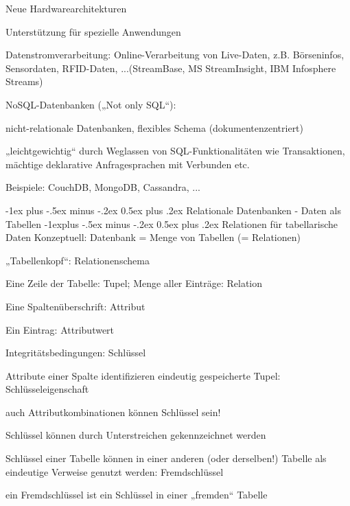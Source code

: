 \documentclass[a4paper]{article}
\makeatletter
\renewcommand{\section}{\@startsection{section}{1}{0mm}%
                                {-1ex plus -.5ex minus -.2ex}%
                                {0.5ex plus .2ex}%
                                {\normalfont\large\bfseries}}
\renewcommand{\subsection}{\@startsection{subsection}{2}{0mm}%
                                {-1explus -.5ex minus -.2ex}%
                                {0.5ex plus .2ex}%
                                {\normalfont\normalsize\bfseries}}
\makeatother
\begin{document}
\begin{multicols}{3}
\begin{itemize*}
    \item Neue Hardwarearchitekturen
    \item Unterstützung für spezielle Anwendungen
    \item Datenstromverarbeitung: Online-Verarbeitung von Live-Daten, z.B. Börseninfos, Sensordaten, RFID-Daten, ...(StreamBase, MS StreamInsight, IBM Infosphere Streams)
    \item NoSQL-Datenbanken („Not only SQL“):
    \begin{itemize*}
        \item nicht-relationale Datenbanken, flexibles Schema (dokumentenzentriert)
        \item „leichtgewichtig“ durch Weglassen von SQL-Funktionalitäten wie Transaktionen, mächtige deklarative Anfragesprachen mit Verbunden etc.
        \item Beispiele: CouchDB, MongoDB, Cassandra, ...
    \end{itemize*}
\end{itemize*}


\section{Relationale Datenbanken - Daten als Tabellen}
\subsection{Relationen für tabellarische Daten}
Konzeptuell: Datenbank = Menge von Tabellen (= Relationen)

\begin{itemize*}
    \item „Tabellenkopf“: Relationenschema
    \item Eine Zeile der Tabelle: Tupel; Menge aller Einträge: Relation
    \item Eine Spaltenüberschrift: Attribut
    \item Ein Eintrag: Attributwert
\end{itemize*}

Integritätsbedingungen: Schlüssel
\begin{itemize*}
    \item Attribute einer Spalte identifizieren eindeutig gespeicherte Tupel: Schlüsseleigenschaft
    \item auch Attributkombinationen können Schlüssel sein!
    \item Schlüssel können durch Unterstreichen gekennzeichnet werden
    \item Schlüssel einer Tabelle können in einer anderen (oder derselben!) Tabelle als eindeutige Verweise genutzt werden: Fremdschlüssel
    \item ein Fremdschlüssel ist ein Schlüssel in einer „fremden“ Tabelle
\end{itemize*}


\end{multicols}
\end{document}
